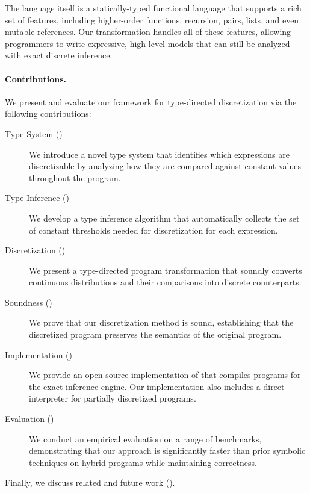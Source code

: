 The \Slice{} language itself is a statically-typed functional language that supports a rich set of features, including higher-order functions, recursion, pairs, lists, and even mutable references. Our transformation handles all of these features, allowing programmers to write expressive, high-level models that can still be analyzed with exact discrete inference.

\paragraph{Contributions.}
We present and evaluate our framework for type-directed discretization via the following contributions:

\begin{description}
    \item[Type System ()] We introduce a novel type system that identifies which expressions are discretizable by analyzing how they are compared against constant values throughout the program.

    \item[Type Inference ()] We develop a type inference algorithm that automatically collects the set of constant thresholds needed for discretization for each expression.

    \item[Discretization ()] We present a type-directed program transformation that soundly converts continuous distributions and their comparisons into discrete counterparts.

    \item[Soundness ()] We prove that our discretization method is sound, establishing that the discretized program preserves the semantics of the original program.

    \item[Implementation ()] We provide an open-source implementation of \Slice{} that compiles programs for the \Dice{} exact inference engine. Our implementation also includes a direct interpreter for partially discretized programs.

    \item[Evaluation ()] We conduct an empirical evaluation on a range of benchmarks, demonstrating that our approach is significantly faster than prior symbolic techniques on hybrid programs while maintaining correctness.
\end{description}

Finally, we discuss related and future work ().

